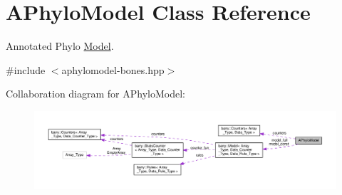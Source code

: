 \hypertarget{class_a_phylo_model}{}\section{A\+Phylo\+Model Class Reference}
\label{class_a_phylo_model}


Annotated Phylo \hyperlink{class_model}{Model}.  




{\ttfamily \#include $<$aphylomodel-\/bones.\+hpp$>$}



Collaboration diagram for A\+Phylo\+Model\+:\nopagebreak
\begin{figure}[H]
\begin{center}
\leavevmode
\includegraphics[width=350pt]{class_a_phylo_model__coll__graph}
\end{center}
\end{figure}
